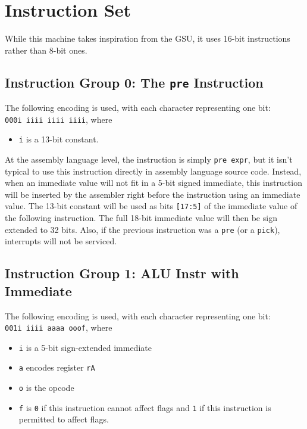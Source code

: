 \documentclass{article}
\begin{document}
	\newpage
	\section{Instruction Set}
	While this machine takes inspiration from the GSU, it uses 16-bit
	instructions rather than 8-bit ones.

	\subsection{Instruction Group 0:  The \texttt{pre} Instruction}
	The following encoding is used, with each character representing one
	bit:  \\
	\texttt{000i iiii iiii iiii}, where 
	
	\singlespacing
	\begin{itemize}
		\item \texttt{i} is a 13-bit constant.
	\end{itemize}

	At the assembly language level, the instruction is simply
	\texttt{pre expr}, but it isn't typical to use this instruction
	directly in assembly language source code.  Instead, when an immediate
	value will not fit in a 5-bit signed immediate, this instruction will
	be inserted by the assembler right before the instruction using an
	immediate value.  The 13-bit constant will be used as bits
	\texttt{[17:5]} of the immediate value of the following instruction.
	The full 18-bit immediate value will then be sign extended to 32 bits.
	Also, if the previous instruction was a \texttt{pre} (or a
	\texttt{pick}), interrupts will not be serviced.

	\subsection{Instruction Group 1:  ALU Instr with Immediate}
	The following encoding is used, with each character representing one
	bit:  \\
	\texttt{001i iiii aaaa ooof}, where

	\singlespacing
	\begin{itemize}
		\item \texttt{i} is a 5-bit sign-extended immediate
		\item \texttt{a} encodes register \texttt{rA}
		\item \texttt{o} is the opcode
		\item \texttt{f} is \texttt{0} if this instruction cannot affect
		flags and \texttt{1} if this instruction is permitted to affect
		flags. 
	\end{itemize}
	\doublespacing
\end{document}
